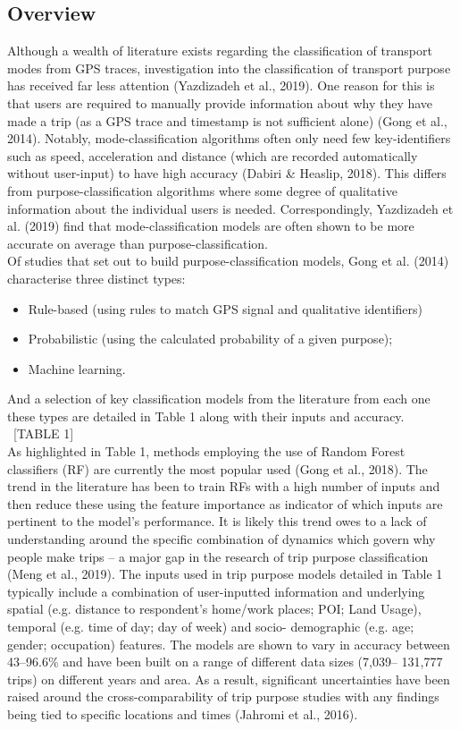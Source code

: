 \subsection{Overview}
Although a wealth of literature exists regarding the classification of transport modes from GPS traces, investigation into the classification of transport purpose has received far less attention (Yazdizadeh et al., 2019). One reason for this is that users are required to manually provide information about why they have made a trip (as a GPS trace and timestamp is not sufficient alone) (Gong et al., 2014). Notably, mode-classification algorithms often only need few key-identifiers such as speed, acceleration and distance (which are recorded automatically without user-input) to have high accuracy (Dabiri \& Heaslip, 2018). This differs from purpose-classification algorithms where some degree of qualitative information about the individual users is needed. Correspondingly, Yazdizadeh et al. (2019) find that mode-classification models are often shown to be more accurate on average than purpose-classification.\\
Of studies that set out to build purpose-classification models, Gong et al. (2014) characterise three distinct types:
\begin{itemize}
\item Rule-based (using rules to match GPS signal and qualitative identifiers)
\item Probabilistic (using the calculated probability of a given purpose);
\item Machine learning.
\end{itemize}
And a selection of key classification models from the literature from each one these types are detailed in Table 1 along with their inputs and accuracy.
\\
\ [TABLE 1]
\\
As highlighted in Table 1, methods employing the use of Random Forest classifiers (RF) are currently the most popular used (Gong et al., 2018). The trend in the literature has been to train RFs with a high number of inputs and then reduce these using the feature importance as indicator of which inputs are pertinent to the model’s performance. It is likely this trend owes to a lack of understanding around the specific combination of dynamics which govern why people make trips – a major gap in the research of trip purpose classification (Meng et al., 2019).
The inputs used in trip purpose models detailed in Table 1 typically include a combination of user-inputted information and underlying spatial (e.g. distance to respondent’s home/work places; POI; Land Usage), temporal (e.g. time of day; day of week) and socio- demographic (e.g. age; gender; occupation) features. The models are shown to vary in accuracy between 43–96.6\% and have been built on a range of different data sizes (7,039– 131,777 trips) on different years and area. As a result, significant uncertainties have been raised around the cross-comparability of trip purpose studies with any findings being tied to specific locations and times (Jahromi et al., 2016).
